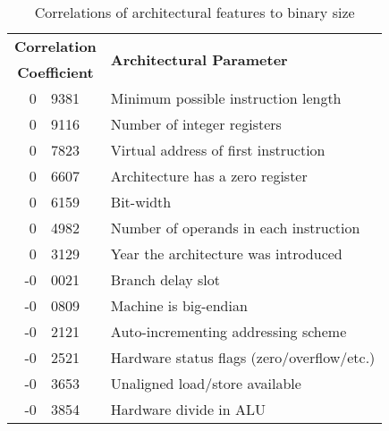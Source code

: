 \begin{table}[tbp]
\caption{Correlations of architectural features to binary size}
\label{table:correlations}
\begin{sf} 
\begin{center}
\begin{tabular}{|r@{.\hspace{0.025em}}l|l|}
\hline
\multicolumn{2}{|c|}{\bf Correlation} & \multirow{2}{*}{\bf Architectural Parameter}\\
\multicolumn{2}{|c|}{\bf Coefficient} & \\
\hline
\hline
 0 & 9381 	& Minimum possible instruction length \\
 0 & 9116	& Number of integer registers \\
 0 & 7823       & Virtual address of first instruction \\ 
 0 & 6607	& Architecture has a zero register \\
 0 & 6159	& Bit-width \\
 0 & 4982	& Number of operands in each instruction \\
 0 & 3129	& Year the architecture was introduced \\
 \hline
-0 & 0021	& Branch delay slot \\
-0 & 0809	& Machine is big-endian \\
-0 & 2121	& Auto-incrementing addressing scheme \\
-0 & 2521	& Hardware status flags (zero/overflow/etc.) \\
-0 & 3653	& Unaligned load/store available \\
-0 & 3854	& Hardware divide in ALU \\
\hline
\end{tabular}
\end{center}
\end{sf}
%
\end{table}
